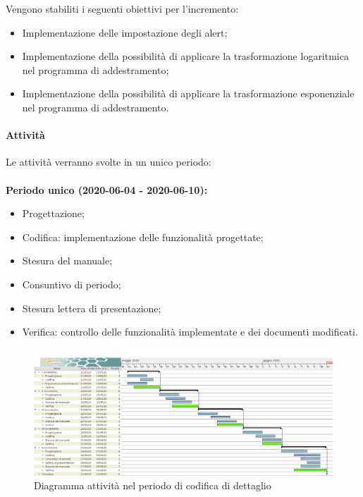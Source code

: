 \documentclass[../piano-di-progetto.tex]{subfiles}
\begin{document}
 Vengono stabiliti i seguenti obiettivi per l'incremento:
 \begin{itemize}
    \item Implementazione delle impostazione degli alert;
    \item Implementazione della possibilità di applicare la trasformazione logaritmica nel programma di addestramento;
    \item Implementazione della possibilità di applicare la trasformazione esponenziale nel programma di addestramento.

 \end{itemize}

\paragraph{Attività}
Le attività verranno svolte in un unico periodo:
\\
\\
\textbf{Periodo unico (2020-06-04 - 2020-06-10):}
\begin{itemize}
    \item Progettazione;
    \item Codifica: implementazione delle funzionalità progettate;
    \item Stesura del manuale;
    \item Consuntivo di periodo;
    \item Stesura lettera di presentazione;
    \item Verifica: controllo delle funzionalità implementate e dei documenti modificati.
\end{itemize}



\newpage
\begin{landscape}
    \begin{figure}[H]
        \centering
        \includegraphics[width=24cm]{img/codifica.png}
        \caption{Diagramma attività nel periodo di codifica di dettaglio}
      \end{figure}
\end{landscape}
\end{document}
